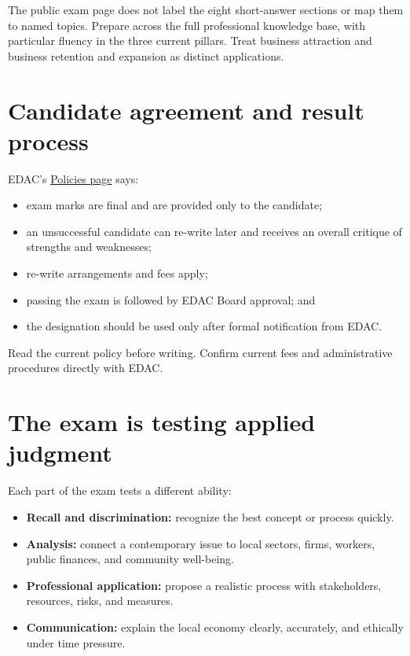 \documentclass[11pt,letterpaper,oneside,openany]{book}
\begin{document}
The public exam page does not label the eight short-answer sections or map them to named topics. Prepare across the full professional knowledge base, with particular fluency in the three current pillars. Treat business attraction and business retention and expansion as distinct applications.


\section[Candidate agreement and result process]{Candidate agreement and result process}
EDAC's \href{https://exam.edac.ca/policies/}{Policies page} says:


\begin{itemize}
\item exam marks are final and are provided only to the candidate;
\item an unsuccessful candidate can re-write later and receives an overall critique of strengths and weaknesses;
\item re-write arrangements and fees apply;
\item passing the exam is followed by EDAC Board approval; and
\item the designation should be used only after formal notification from EDAC.
\end{itemize}


Read the current policy before writing. Confirm current fees and administrative procedures directly with EDAC.


\section[The exam is testing applied judgment]{The exam is testing applied judgment}
Each part of the exam tests a different ability:


\begin{itemize}
\item \textbf{Recall and discrimination:} recognize the best concept or process quickly.
\item \textbf{Analysis:} connect a contemporary issue to local sectors, firms, workers, public finances, and community well-being.
\item \textbf{Professional application:} propose a realistic process with stakeholders, resources, risks, and measures.
\item \textbf{Communication:} explain the local economy clearly, accurately, and ethically under time pressure.
\end{itemize}
\end{document}
